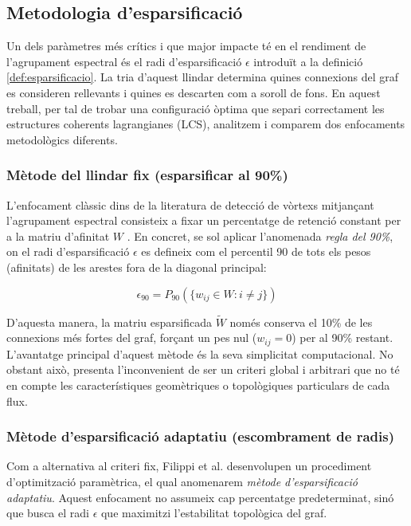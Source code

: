 \documentclass[12,twoside]{TFG-GM}
\theoremstyle{definition}
\theoremstyle{remark}
\begin{document}
\subsection{Metodologia d'esparsificació}

Un dels paràmetres més crítics i que major impacte té en el rendiment de l'agrupament espectral és el radi d'esparsificació $\epsilon$ introduït a la definició \ref{def:esparsificacio}. La tria d'aquest llindar determina quines connexions del graf es consideren rellevants i quines es descarten com a soroll de fons. En aquest treball, per tal de trobar una configuració òptima que separi correctament les estructures coherents lagrangianes (LCS), analitzem i comparem dos enfocaments metodològics diferents.

\subsubsection{Mètode del llindar fix (esparsificar al 90\%)}
\label{seccio:esparsfificar90}

L'enfocament clàssic dins de la literatura de detecció de vòrtexs mitjançant l'agrupament espectral consisteix a fixar un percentatge de retenció constant per a la matriu d'afinitat $W$ \cite{Hadjighasem2016}. En concret, se sol aplicar l'anomenada \textit{regla del 90\%}, on el radi d'esparsificació $\epsilon$ es defineix com el percentil 90 de tots els pesos (afinitats) de les arestes fora de la diagonal principal:

\begin{equation}
    \epsilon_{90} = P_{90}\left(\{w_{ij} \in W : i \neq j\}\right)
\end{equation}

D'aquesta manera, la matriu esparsificada $\tilde{W}$ només conserva el 10\% de les connexions més fortes del graf, forçant un pes nul ($w_{ij}=0$) per al 90\% restant. L'avantatge principal d'aquest mètode és la seva simplicitat computacional. No obstant això, presenta l'inconvenient de ser un criteri global i arbitrari que no té en compte les característiques geomètriques o topològiques particulars de cada flux.

\subsubsection{Mètode d'esparsificació adaptatiu (escombrament de radis)}

Com a alternativa al criteri fix, Filippi et al. \cite{Filippi2021} desenvolupen un procediment d'optimització paramètrica, el qual anomenarem \textit{mètode d'esparsificació adaptatiu}. Aquest enfocament no assumeix cap percentatge predeterminat, sinó que busca el radi $\epsilon$ que maximitzi l'estabilitat topològica del graf.
\end{document}
